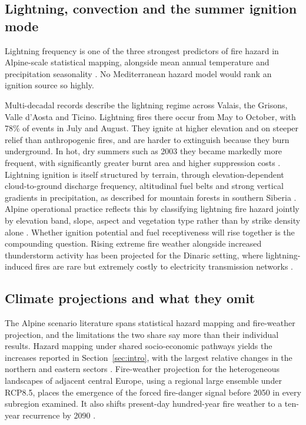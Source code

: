 \documentclass[11pt,a4paper]{article}
\begin{document}
\subsection{Lightning, convection and the summer ignition mode}

Lightning frequency is one of the three strongest predictors of fire hazard in Alpine-scale statistical mapping, alongside mean annual temperature and precipitation seasonality \citep{gerberding_mapping_2025}. No Mediterranean hazard model would rank an ignition source so highly.

Multi-decadal records describe the lightning regime across Valais, the Grisons, Valle d'Aosta and Ticino. Lightning fires there occur from May to October, with 78\% of events in July and August. They ignite at higher elevation and on steeper relief than anthropogenic fires, and are harder to extinguish because they burn underground. In hot, dry summers such as 2003 they became markedly more frequent, with significantly greater burnt area and higher suppression costs \citep{conedera_lightninginduced_2006}. Lightning ignition is itself structured by terrain, through elevation-dependent cloud-to-ground discharge frequency, altitudinal fuel belts and strong vertical gradients in precipitation, as described for mountain forests in southern Siberia \citep{baranovskiy_deterministic_2021}. Alpine operational practice reflects this by classifying lightning fire hazard jointly by elevation band, slope, aspect and vegetation type rather than by strike density alone \citep{muller_towards_2020}. Whether ignition potential and fuel receptiveness will rise together is the compounding question. Rising extreme fire weather alongside increased thunderstorm activity has been projected for the Dinaric setting, where lightning-induced fires are rare but extremely costly to electricity transmission networks \citep{kyriakopoulos_impact_2023}.

\subsection{Climate projections and what they omit}

The Alpine scenario literature spans statistical hazard mapping and fire-weather projection, and the limitations the two share say more than their individual results. Hazard mapping under shared socio-economic pathways yields the increases reported in Section~\ref{sec:intro}, with the largest relative changes in the northern and eastern sectors \citep{gerberding_mapping_2025}. Fire-weather projection for the heterogeneous landscapes of adjacent central Europe, using a regional large ensemble under RCP8.5, places the emergence of the forced fire-danger signal before 2050 in every subregion examined. It also shifts present-day hundred-year fire weather to a ten-year recurrence by 2090 \citep{miller_climate_2024}.
\end{document}
